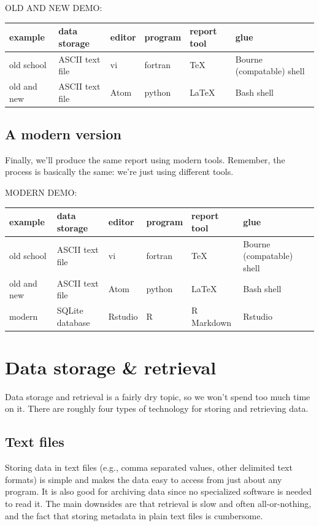 \documentclass[]{book}
\begin{document}
OLD AND NEW DEMO:

\begin{longtable}[]{@{}llllll@{}}
\toprule
example & data storage & editor & program & report tool & glue\tabularnewline
\midrule
\endhead
old school & ASCII text file & vi & fortran & TeX & Bourne (compatable) shell\tabularnewline
old and new & ASCII text file & Atom & python & LaTeX & Bash shell\tabularnewline
\bottomrule
\end{longtable}

\hypertarget{a-modern-version}{%
\subsection{A modern version}\label{a-modern-version}}

Finally, we'll produce the same report using modern tools. Remember, the process is basically the same: we're just using different tools.

MODERN DEMO:

\begin{longtable}[]{@{}llllll@{}}
\toprule
example & data storage & editor & program & report tool & glue\tabularnewline
\midrule
\endhead
old school & ASCII text file & vi & fortran & TeX & Bourne (compatable) shell\tabularnewline
old and new & ASCII text file & Atom & python & LaTeX & Bash shell\tabularnewline
modern & SQLite database & Rstudio & R & R Markdown & Rstudio\tabularnewline
\bottomrule
\end{longtable}

\hypertarget{data-storage-retrieval}{%
\section{Data storage \& retrieval}\label{data-storage-retrieval}}

Data storage and retrieval is a fairly dry topic, so we won't spend too much time on it. There are roughly four types of technology for storing and retrieving data.

\hypertarget{text-files}{%
\subsection{Text files}\label{text-files}}

Storing data in text files (e.g., comma separated values, other delimited text formats) is simple and makes the data easy to access from just about any program. It is also good for archiving data since no specialized software is needed to read it. The main downsides are that retrieval is slow and often all-or-nothing, and the fact that storing metadata in plain text files is cumbersome.
\end{document}
